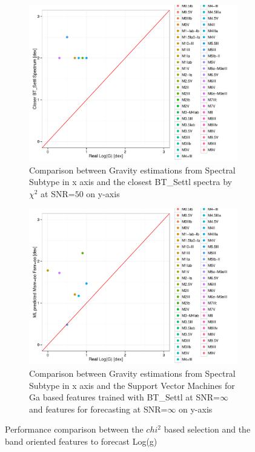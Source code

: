 \begin {figure}
 \centering
 \begin{subfigure}{.85\textwidth}
  \centering
  \includegraphics[width=12cm]{figs/G_chi2_50_cesetti.pdf}
  \caption{Comparison between Gravity estimations from Spectral Subtype 
 in x axis and the closest BT\_Settl spectra by $\chi^2$ at SNR=$50$ on y-axis}
 \label{fig:chi2_50_spt}
 \end{subfigure}
  \begin{subfigure}{.85\textwidth}
  \centering
  \includegraphics[width=12cm]{figs/G_gam_oo_cesetti.pdf}
  \caption{Comparison between Gravity estimations from Spectral Subtype 
 in x axis and the Support Vector Machines for Ga based features trained with BT\_Settl 
 at SNR=$\infty$ and features for forecasting at SNR=$\infty$ on y-axis}
 \label{fig:ga_too50ga_spt}
 \end{subfigure}
 \label {fig:comp02}
 \caption{Performance comparison between the $chi^2$ based selection 
          and the band oriented features to forecast Log(g)}
\end {figure}
%

